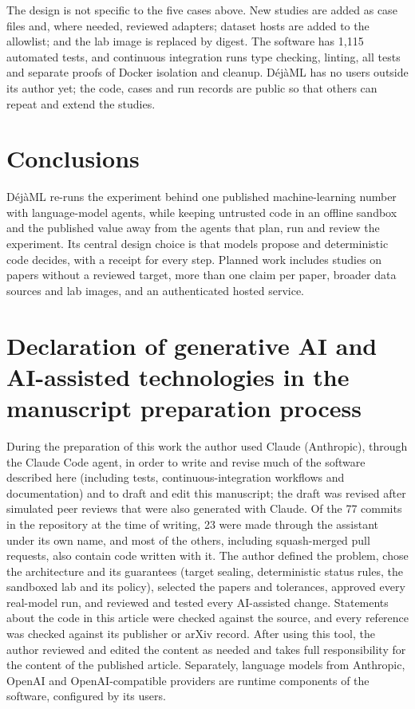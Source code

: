\documentclass[preprint,12pt]{elsarticle}
\newcommand{\dejaml}{D\'ej\`aML}
\begin{document}
The design is not specific to the five cases above. New studies are added
as case files and, where needed, reviewed adapters; dataset hosts are added
to the allowlist; and the lab image is replaced by digest. The software has
1{,}115 automated tests, and continuous integration runs type
checking, linting, all tests and separate proofs of Docker isolation and
cleanup. \dejaml{} has no users outside its author yet; the code, cases and run
records are public so that others can repeat and extend the studies.

\section{Conclusions}
\label{sec:conclusions}

\dejaml{} re-runs the experiment behind one published machine-learning number
with language-model agents, while keeping untrusted code in an offline sandbox
and the published value away from the agents that plan, run and review the
experiment. Its central design choice is that models propose and deterministic
code decides, with a receipt for every step. Planned work includes studies on
papers without a reviewed target, more than one claim per paper, broader data
sources and lab images, and an authenticated hosted service.

\section*{Declaration of generative AI and AI-assisted technologies in the manuscript preparation process}

During the preparation of this work the author used Claude (Anthropic),
through the Claude Code agent, in order to write and revise much of the
software described here (including tests, continuous-integration workflows and
documentation) and to draft and edit this manuscript; the draft was revised
after simulated peer reviews that were also generated with Claude. Of the 77
commits in the repository at the time of writing, 23 were made through the
assistant under its own name, and most of the others, including squash-merged
pull requests, also contain code written with it. The author defined the problem, chose the
architecture and its guarantees (target sealing, deterministic status rules,
the sandboxed lab and its policy), selected the papers and tolerances,
approved every real-model run, and reviewed and tested every AI-assisted
change. Statements about the code in this article were checked against the
source, and every reference was checked against its publisher or arXiv record.
After using this tool, the author reviewed and edited the content as needed and
takes full responsibility for the content of the published article.
Separately, language models from Anthropic, OpenAI and OpenAI-compatible
providers are runtime components of the software, configured by its users.
\end{document}
